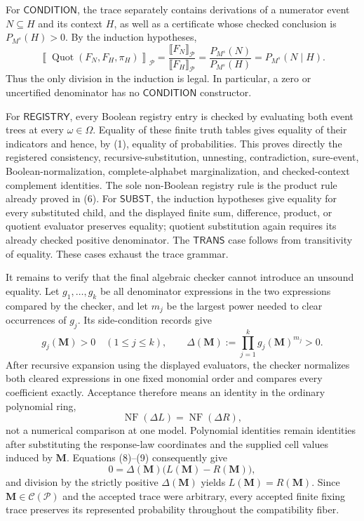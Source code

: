 For \(\mathsf{CONDITION}\), the trace separately contains derivations of a numerator event \(N\subseteq H\) and its context \(H\), as well as a certificate whose checked conclusion is \(P_{M^s}(H)>0\).  By the induction hypotheses,
\[
\left\llbracket\operatorname{Quot}(F_N,F_H,\pi_H)\right\rrbracket_{\mathcal P}
=\frac{\llbracket F_N\rrbracket_{\mathcal P}}{\llbracket F_H\rrbracket_{\mathcal P}}
=\frac{P_{M^s}(N)}{P_{M^s}(H)}
=P_{M^s}(N\mid H).
\tag{7}
\]
Thus the only division in the induction is legal.  In particular, a zero or uncertified denominator has no \(\mathsf{CONDITION}\) constructor.

For \(\mathsf{REGISTRY}\), every Boolean registry entry is checked by evaluating both event trees at every \(\omega\in\Omega\).  Equality of these finite truth tables gives equality of their indicators and hence, by (1), equality of probabilities.  This proves directly the registered consistency, recursive-substitution, unnesting, contradiction, sure-event, Boolean-normalization, complete-alphabet marginalization, and checked-context complement identities.  The sole non-Boolean registry rule is the product rule already proved in (6).  For \(\mathsf{SUBST}\), the induction hypotheses give equality for every substituted child, and the displayed finite sum, difference, product, or quotient evaluator preserves equality; quotient substitution again requires its already checked positive denominator.  The \(\mathsf{TRANS}\) case follows from transitivity of equality.  These cases exhaust the trace grammar.

It remains to verify that the final algebraic checker cannot introduce an unsound equality.  Let \(g_1,\ldots,g_k\) be all denominator expressions in the two expressions compared by the checker, and let \(m_j\) be the largest power needed to clear occurrences of \(g_j\).  Its side-condition records give
\[
g_j(\mathbf M)>0\quad(1\le j\le k),
\qquad
\Delta(\mathbf M):=\prod_{j=1}^kg_j(\mathbf M)^{m_j}>0.
\tag{8}
\]
After recursive expansion using the displayed evaluators, the checker normalizes both cleared expressions in one fixed monomial order and compares every coefficient exactly.  Acceptance therefore means an identity in the ordinary polynomial ring,
\[
\operatorname{NF}\!\left(\Delta L\right)
=\operatorname{NF}\!\left(\Delta R\right),
\tag{9}
\]
not a numerical comparison at one model.  Polynomial identities remain identities after substituting the response-law coordinates and the supplied cell values induced by \(\mathbf M\).  Equations (8)--(9) consequently give
\[
0=\Delta(\mathbf M)\bigl(L(\mathbf M)-R(\mathbf M)\bigr),
\]
and division by the strictly positive \(\Delta(\mathbf M)\) yields \(L(\mathbf M)=R(\mathbf M)\).  Since \(\mathbf M\in\mathcal C(\mathcal P)\) and the accepted trace were arbitrary, every accepted finite fixing trace preserves its represented probability throughout the compatibility fiber.